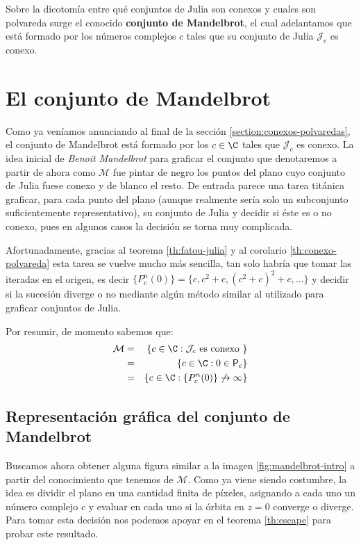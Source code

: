 Sobre la dicotomía entre qué conjuntos de Julia son conexos y cuales son polvareda surge el conocido \textbf{conjunto de Mandelbrot}, el cual adelantamos que está formado por los números complejos $c$ tales que su conjunto de Julia $\mathcal{J}_c$ es conexo. 

\section{El conjunto de Mandelbrot}

Como ya veníamos anunciando al final de la sección \ref{section:conexos-polvaredas}, el conjunto de Mandelbrot está formado por los $c\in\C$ tales que $\mathcal{J}_c$ es conexo. La idea inicial de \textit{Benoit Mandelbrot} para graficar el conjunto que denotaremos a partir de ahora como $\mathcal{M}$ fue pintar de negro los puntos del plano cuyo conjunto de Julia fuese conexo y de blanco el resto. De entrada parece una tarea titánica graficar, para cada punto del plano (aunque realmente sería solo un subconjunto suficientemente representativo), su conjunto de Julia y decidir si éste es o no conexo, pues en algunos casos la decisión se torna muy complicada.

Afortunadamente, gracias al teorema \ref{th:fatou-julia} y al corolario \ref{th:conexo-polvareda} esta tarea se vuelve mucho más sencilla, tan solo habría que tomar las iteradas en el origen, es decir $\{P_c^n(0)\}=\{c, c^2+c, (c^2+c)^2+c, \dots\}$ y decidir si la sucesión diverge o no mediante algún método similar al utilizado para graficar conjuntos de Julia.

Por resumir, de momento sabemos que:
\begin{eqnarray*}
  \mathcal{M} & = & \{c\in\C : \mathcal{J}_c \text{ es conexo }\} \\
              & = & \{c\in\C : 0\in\mathsf{P}_c \} \\
              & = & \{c\in\C : \{P_c^n(0)\}\not\rightarrow\infty\}
\end{eqnarray*}

\subsection{Representación gráfica del conjunto de Mandelbrot}

Buscamos ahora obtener alguna figura similar a la imagen \ref{fig:mandelbrot-intro} a partir del conocimiento que tenemos de $\mathcal M$. Como ya viene siendo costumbre, la idea es dividir el plano en una cantidad finita de píxeles, asignando a cada uno un número complejo $c$ y evaluar en cada uno si la órbita en $z=0$ converge o diverge. Para tomar esta decisión nos podemos apoyar en el teorema \ref{th:escape} para probar este resultado.

